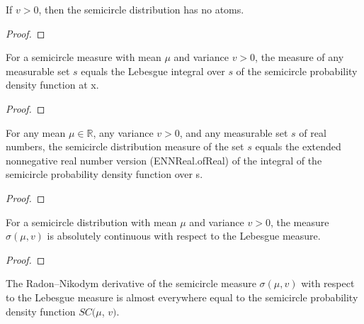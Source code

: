\begin{lemma}
  \label{lem:noAtoms_semicircleReal}
  \leanok
  If $v > 0$, then the semicircle distribution has no atoms.
\end{lemma}

\begin{proof}
\leanok
\end{proof}

\begin{lemma}
  \label{lem:semicircleReal_apply}
  \leanok
  For a semicircle measure with mean $\mu$ and variance $v > 0$, the measure of any measurable set $s$ equals the Lebesgue integral over $s$ of the semicircle probability density function at x.
\end{lemma}

\begin{proof}
\leanok
\end{proof}

\begin{lemma}
  \label{lem:semicircleReal_apply_eq_integral}
  \leanok
  For any mean $\mu \in \mathbb{R}$, any variance $v > 0$, and any measurable set $s$ of real numbers, the semicircle distribution measure of the set $s$ equals the extended nonnegative real number version (ENNReal.ofReal) of the integral of the semicircle probability density function over s.
\end{lemma}

\begin{proof}
\leanok
\end{proof}

\begin{lemma}
  \label{lem:semicircleReal_absolutelyContinuous}
  \leanok
  For a semicircle distribution with mean $\mu$ and variance $v > 0$, the measure $\sigma(\mu, v)$ is absolutely continuous with respect to the Lebesgue measure.
\end{lemma}

\begin{proof}
\leanok
\end{proof}

\begin{lemma}
  \label{lem:rnDeriv_semicircleReal}
  \leanok
  The Radon–Nikodym derivative of the semicircle measure $\sigma(\mu, v)$ with respect to the Lebesgue measure is almost everywhere equal to the semicircle probability density function $SC(\mu$, $v)$.
\end{lemma}

